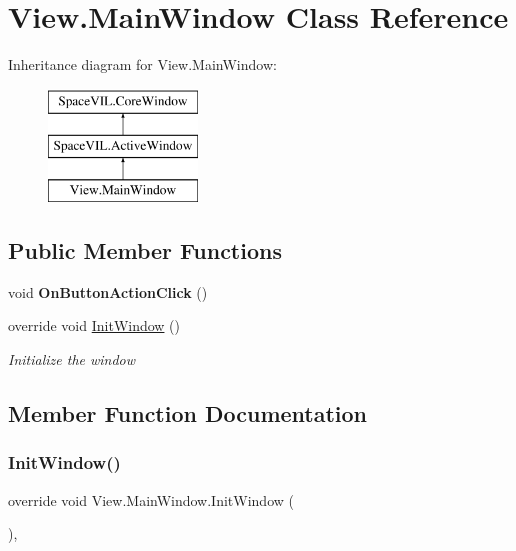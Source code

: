 \hypertarget{class_view_1_1_main_window}{}\section{View.\+Main\+Window Class Reference}
\label{class_view_1_1_main_window}
Inheritance diagram for View.\+Main\+Window\+:\begin{figure}[H]
\begin{center}
\leavevmode
\includegraphics[height=3.000000cm]{class_view_1_1_main_window}
\end{center}
\end{figure}
\subsection*{Public Member Functions}
\begin{DoxyCompactItemize}
\item 
\mbox{\label{class_view_1_1_main_window_a002cef93db7a114f5118476662d545e8}} 
void {\bfseries On\+Button\+Action\+Click} ()
\item 
override void \mbox{\hyperlink{class_view_1_1_main_window_a1c3022ebb735b59e12ba1e9bc5cf3a90}{Init\+Window}} ()
\begin{DoxyCompactList}\small\item\em Initialize the window \end{DoxyCompactList}\end{DoxyCompactItemize}


\subsection{Member Function Documentation}
\mbox{\label{class_view_1_1_main_window_a1c3022ebb735b59e12ba1e9bc5cf3a90}} 
\subsubsection{\texorpdfstring{Init\+Window()}{InitWindow()}}
{\footnotesize\ttfamily override void View.\+Main\+Window.\+Init\+Window (\begin{DoxyParamCaption}{ }\end{DoxyParamCaption})\hspace{0.3cm}{\ttfamily [inline]}, {\ttfamily [virtual]}}



